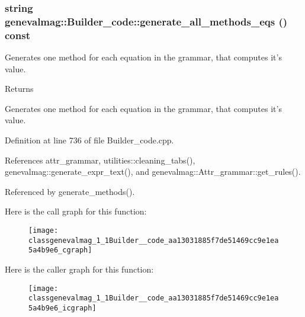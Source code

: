 \hypertarget{classgenevalmag_1_1Builder__code_aa13031885f7de51469cc9e1ea5a4b9e6}{
\subsubsection[{generate\_\-all\_\-methods\_\-eqs}]{\setlength{\rightskip}{0pt plus 5cm}string genevalmag::Builder\_\-code::generate\_\-all\_\-methods\_\-eqs () const}}
\label{classgenevalmag_1_1Builder__code_aa13031885f7de51469cc9e1ea5a4b9e6}
Generates one method for each equation in the grammar, that computes it's value. \begin{DoxyReturn}{Returns}

\end{DoxyReturn}
Generates one method for each equation in the grammar, that computes it's value. 

Definition at line 736 of file Builder\_\-code.cpp.



References attr\_\-grammar, utilities::cleaning\_\-tabs(), genevalmag::generate\_\-expr\_\-text(), and genevalmag::Attr\_\-grammar::get\_\-rules().



Referenced by generate\_\-methods().



Here is the call graph for this function:\nopagebreak
\begin{figure}[H]
\begin{center}
\leavevmode
\texttt{[image: classgenevalmag\_1\_1Builder\_\_code\_aa13031885f7de51469cc9e1ea5a4b9e6\_cgraph]}
\end{center}
\end{figure}




Here is the caller graph for this function:\nopagebreak
\begin{figure}[H]
\begin{center}
\leavevmode
\texttt{[image: classgenevalmag\_1\_1Builder\_\_code\_aa13031885f7de51469cc9e1ea5a4b9e6\_icgraph]}
\end{center}
\end{figure}


